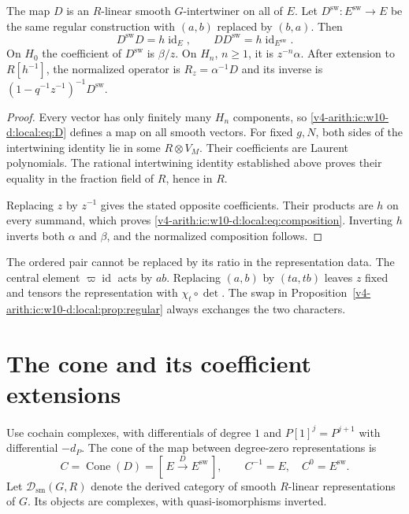 \begin{proposition}\label{v4-arith:ic:w10-d:local:prop:regular}
The map $D$ is an $R$-linear smooth $G$-intertwiner on all of $E$.
Let $D^\mathrm{sw}:E^\mathrm{sw}\to E$ be the same regular construction with $(a,b)$ replaced by $(b,a)$.
Then
\begin{equation}\label{v4-arith:ic:w10-d:local:eq:composition}
 D^\mathrm{sw} D=h\operatorname{id}_E,\qquad DD^\mathrm{sw}=h\operatorname{id}_{E^\mathrm{sw}}.
\end{equation}
On $H_0$ the coefficient of $D^\mathrm{sw}$ is $\beta/z$.
On $H_n$, $n\ge1$, it is $z^{-n}\alpha$.
After extension to $R[h^{-1}]$, the normalized operator is
$R_z=\alpha^{-1}D$ and its inverse is $(1-q^{-1}z^{-1})^{-1}D^\mathrm{sw}$.
\end{proposition}
\begin{proof}
Every vector has only finitely many $H_n$ components, so \eqref{v4-arith:ic:w10-d:local:eq:D} defines a map on all smooth vectors.
For fixed $g,N$, both sides of the intertwining identity lie in some $R\otimes V_M$.
Their coefficients are Laurent polynomials.
The rational intertwining identity established above proves their equality in the fraction field of $R$, hence in $R$.

Replacing $z$ by $z^{-1}$ gives the stated opposite coefficients.
Their products are $h$ on every summand, which proves \eqref{v4-arith:ic:w10-d:local:eq:composition}.
Inverting $h$ inverts both $\alpha$ and $\beta$, and the normalized composition follows.
\end{proof}

The ordered pair cannot be replaced by its ratio in the representation data.
The central element $\varpi\operatorname{id}$ acts by $ab$.
Replacing $(a,b)$ by $(ta,tb)$ leaves $z$ fixed and tensors the representation
with $\chi_t\circ\det$.
The swap in Proposition~\ref{v4-arith:ic:w10-d:local:prop:regular} always exchanges the two characters.

\section{The cone and its coefficient extensions}

Use cochain complexes, with differentials of degree $1$ and
$P[1]^j=P^{j+1}$ with differential $-d_P$.
The cone of the map between degree-zero representations is
\[
 C=\operatorname{Cone}(D)=
 [\,E\xrightarrow{D}E^\mathrm{sw}\,],
 \qquad C^{-1}=E,\quad C^0=E^\mathrm{sw}.
\]
Let $\mathcal D_{\mathrm{sm}}(G,R)$ denote the derived category of smooth
$R$-linear representations of $G$.
Its objects are complexes, with quasi-isomorphisms inverted.


